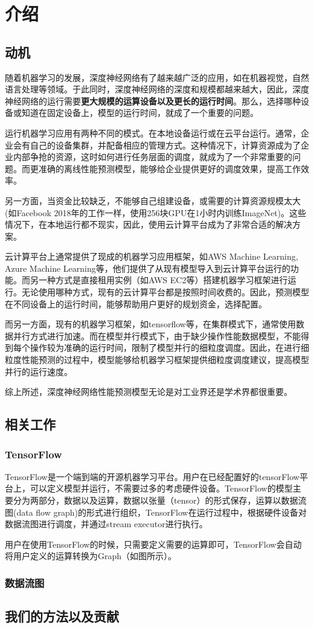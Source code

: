 \chapter{介绍}
\label{cha:intro}

\section{动机}
\label{sec:motivation}
    随着机器学习的发展，深度神经网络有了越来越广泛的应用，如在机器视觉，自然语言处理等领域。于此同时，深度神经网络的深度和规模都越来越大，因此，深度神经网络的运行需要{\bfseries 更大规模的运算设备以及更长的运行时间}。那么，选择哪种设备或知道在固定设备上，模型的运行时间，就成了一个重要的问题。

    运行机器学习应用有两种不同的模式。在本地设备运行或在云平台运行。通常，企业会有自己的设备集群，并配备相应的管理方式。这种情况下，计算资源成为了企业内部争抢的资源，这时如何进行任务层面的调度，就成为了一个非常重要的问题。而更准确的离线性能预测模型，能够给企业提供更好的调度效果，提高工作效率。
    
    另一方面，当资金比较缺乏，不能够自己组建设备，或需要的计算资源规模太大(如Facebook 2018年的工作一样，使用256块GPU在1小时内训练ImageNet)。这些情况下，在本地运行都不现实，因此，使用云计算平台成为了非常合适的解决方案。
    
    云计算平台上通常提供了现成的机器学习应用框架，如AWS Machine Learning, Azure Machine Learning等，他们提供了从现有模型导入到云计算平台运行的功能。而另一种方式是直接租用实例（如AWS EC2等）搭建机器学习框架进行运行。无论使用哪种方式，现有的云计算平台都是按照时间收费的。因此，预测模型在不同设备上的运行时间，能够帮助用户更好的规划资金，选择配置。
    
    而另一方面，现有的机器学习框架，如tensorflow等，在集群模式下，通常使用数据并行方式进行加速。而在模型并行模式下，由于缺少操作性能数据模型，不能得到每个操作较为准确的运行时间，限制了模型并行的细粒度调度。因此，在进行细粒度性能预测的过程中，模型能够给机器学习框架提供细粒度调度建议，提高模型并行的运行速度。
    
    综上所述，深度神经网络性能预测模型无论是对工业界还是学术界都很重要。

\section{相关工作}
\label{sec:related}

\subsection{TensorFlow}
    TensorFlow是一个端到端的开源机器学习平台。用户在已经配置好的tensorFlow平台上，可以定义模型并运行，不需要过多的考虑硬件设备。TensorFlow的模型主要分为两部分，数据以及运算，数据以张量（tensor）的形式保存，运算以数据流图(data flow graph)的形式进行组织，TensorFlow在运行过程中，根据硬件设备对数据流图进行调度，并通过stream executor进行执行。
    
    用户在使用TensorFlow的时候，只需要定义需要的运算即可，TensorFlow会自动将用户定义的运算转换为Graph（如图所示）。
    
\subsection{数据流图}

\section{我们的方法以及贡献}